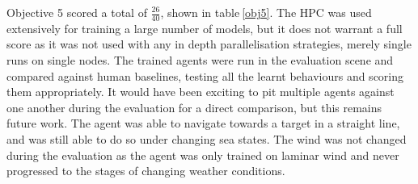 \begin{table}[!htb]
    \centering
    \caption{Objective 5 Evaluation}\label{obj5}
\end{table}

Objective 5 scored a total of $\frac{26}{40}$, shown in table$~$\ref{obj5}. The HPC was used extensively for training a large number of models, but it does not warrant a full score as it was not used with any in depth parallelisation strategies, merely single runs on single nodes. The trained agents were run in the evaluation scene and compared against human baselines, testing all the learnt behaviours and scoring them appropriately. It would have been exciting to pit multiple agents against one another during the evaluation for a direct comparison, but this remains future work. The agent was able to navigate towards a target in a straight line, and was still able to do so under changing sea states. The wind was not changed during the evaluation as the agent was only trained on laminar wind and never progressed to the stages of changing weather conditions.

